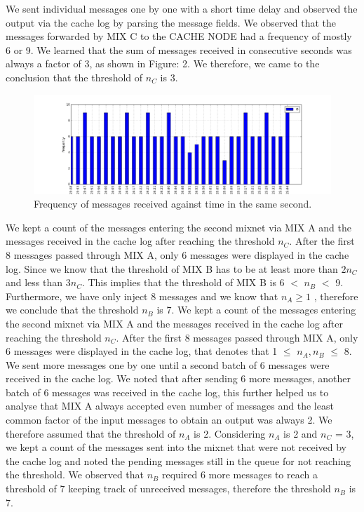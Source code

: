 \documentclass[preprint,12pt,3p]{elsarticle}
\begin{document}
\begin{flushleft}
We sent individual messages one by one with a short time delay and observed the output via the cache log by parsing the message fields. We observed that the messages forwarded by MIX C to the CACHE NODE had a frequency of mostly 6 or 9. We learned that the sum of messages received in consecutive seconds was always a factor of 3, as shown in Figure: 2. We therefore, we came to the conclusion that the threshold of $n_C$ is 3.
\newline
\begin{figure}[h]
\caption{Frequency of messages received against time in the same second.}
\centering
\includegraphics[width=\textwidth]{second}
\end{figure}
\newline
We kept a count of the messages entering the second mixnet via MIX A and the messages received in the cache log after reaching the threshold $n_C$. After the first 8 messages passed through MIX A, only 6 messages were displayed in the cache log. Since we know that the threshold of MIX B has to be at least more than $2n_C$ and less than $3n_C$. This implies that the threshold of MIX B is 6 $<$ $n_B$ $<$ 9. Furthermore, we have only inject 8 messages and we know that $n_A\geq 1$ , therefore we conclude that the threshold $n_B$ is 7.
\newline
We kept a count of the messages entering the second mixnet via MIX A and the messages received in the cache log after reaching the threshold $n_C$. After the first 8 messages passed through MIX A, only 6 messages were displayed in the cache log, that denotes that 1 $\leq$ $n_A, n_B$ $\leq$ 8. We sent more messages one by one until a second batch of 6 messages were received in the cache log. We noted that after sending 6 more messages, another batch of 6 messages was received in the cache log, this further helped us to analyse that MIX A always accepted even number of messages and the least common factor of the input messages to obtain an output was always 2. We therefore assumed that the threshold of  $n_A$ is 2.
\newline
\newline
Considering $n_A$ is 2 and $n_C$ = 3, we kept a count of the messages sent into the mixnet that were not received by the cache log and noted the pending messages still in the queue for not reaching the threshold. We observed that $n_B$ required 6 more messages to reach a threshold of 7 keeping  track of unreceived messages, therefore the threshold $n_B$ is 7.
\newline



\end{flushleft}
\end{document}
